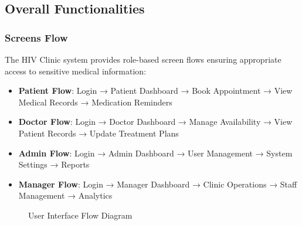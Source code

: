 \documentclass[12pt,a4paper]{article}
\begin{document}
\subsection{Overall Functionalities}

\subsubsection{Screens Flow}

The HIV Clinic system provides role-based screen flows ensuring appropriate access to sensitive medical information:

\begin{itemize}
    \item \textbf{Patient Flow}: Login → Patient Dashboard → Book Appointment → View Medical Records → Medication Reminders
    \item \textbf{Doctor Flow}: Login → Doctor Dashboard → Manage Availability → View Patient Records → Update Treatment Plans
    \item \textbf{Admin Flow}: Login → Admin Dashboard → User Management → System Settings → Reports
    \item \textbf{Manager Flow}: Login → Manager Dashboard → Clinic Operations → Staff Management → Analytics
\end{itemize}

\begin{figure}
\centering
{}
\caption{User Interface Flow Diagram}
\label{fig:ui-flow-diagram}
\end{figure}
\end{document}
